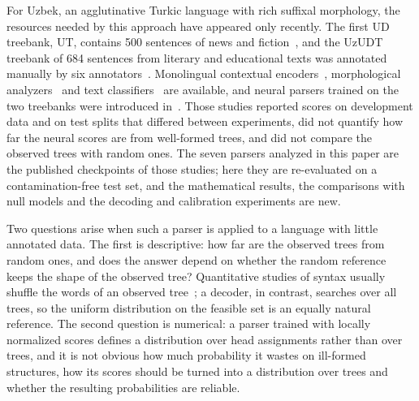 \documentclass[mathematics,article,submit,pdftex,oneauthor]{Definitions/mdpi}
\begin{document}
For Uzbek, an agglutinative Turkic language with rich suffixal morphology, the resources needed by this approach have appeared only recently.
The first UD treebank, UT, contains 500 sentences of news and fiction~\cite{Akhundjanova2025}, and the UzUDT treebank of 684 sentences from literary and educational texts was annotated manually by six annotators~\cite{MatlatipovDiB2026,MatlatipovLREC2026,MatlatipovUSBEREIT2026a}.
Monolingual contextual encoders~\cite{Mamasaidov2023,Kuriyozov2024}, morphological analyzers~\cite{Salaev2024,Mengliev2021Uzbek} and text classifiers~\cite{Madatov2025Uzbek,Saidov2026Uzbek} are available, and neural parsers trained on the two treebanks were introduced in~\cite{MatlatipovNLDB2027,MatlatipovEDM2026,MatlatipovUSBEREIT2026b}.
Those studies reported scores on development data and on test splits that differed between experiments, did not quantify how far the neural scores are from well-formed trees, and did not compare the observed trees with random ones.
The seven parsers analyzed in this paper are the published checkpoints of those studies; here they are re-evaluated on a contamination-free test set, and the mathematical results, the comparisons with null models and the decoding and calibration experiments are new.

Two questions arise when such a parser is applied to a language with little annotated data.
The first is descriptive: how far are the observed trees from random ones, and does the answer depend on whether the random reference keeps the shape of the observed tree?
Quantitative studies of syntax usually shuffle the words of an observed tree~\cite{FerreriCancho2004,FerreriCancho2018,FerreriCancho2022}; a decoder, in contrast, searches over all trees, so the uniform distribution on the feasible set is an equally natural reference.
The second question is numerical: a parser trained with locally normalized scores defines a distribution over head assignments rather than over trees, and it is not obvious how much probability it wastes on ill-formed structures, how its scores should be turned into a distribution over trees and whether the resulting probabilities are reliable.
\end{document}

